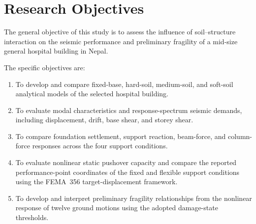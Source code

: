 \section{Research Objectives}
The general objective of this study is to assess the influence of soil--structure interaction on the seismic performance and preliminary fragility of a mid-size general hospital building in Nepal.

The specific objectives are:
\begin{enumerate}
    \item To develop and compare fixed-base, hard-soil, medium-soil, and soft-soil analytical models of the selected hospital building.
    \item To evaluate modal characteristics and response-spectrum seismic demands, including displacement, drift, base shear, and storey shear.
    \item To compare foundation settlement, support reaction, beam-force, and column-force responses across the four support conditions.
    \item To evaluate nonlinear static pushover capacity and compare the reported performance-point coordinates of the fixed and flexible support conditions using the FEMA~356 target-displacement framework.
    \item To develop and interpret preliminary fragility relationships from the nonlinear response of twelve ground motions using the adopted damage-state thresholds.
\end{enumerate}

